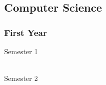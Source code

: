 \subsection{Computer Science}

\subsubsection{First Year}
\begin{center}
\begin{multicols}{2}
Semester 1 \\
 \\
\vfill
\columnbreak

Semester 2 \\
 \\
\end{multicols}
\end{center}